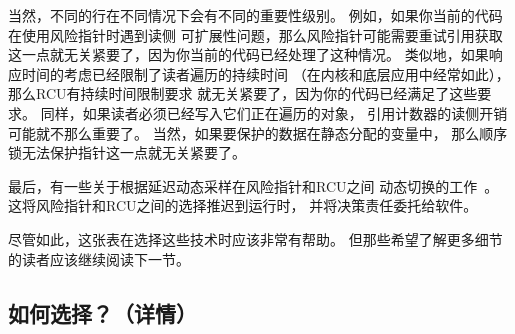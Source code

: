 当然，不同的行在不同情况下会有不同的重要性级别。
例如，如果你当前的代码在使用风险指针时遇到读侧
可扩展性问题，那么风险指针可能需要重试引用获取
这一点就无关紧要了，因为你当前的代码已经处理了这种情况。
类似地，如果响应时间的考虑已经限制了读者遍历的持续时间
（在内核和底层应用中经常如此），那么RCU有持续时间限制要求
就无关紧要了，因为你的代码已经满足了这些要求。
同样，如果读者必须已经写入它们正在遍历的对象，
引用计数器的读侧开销可能就不那么重要了。
当然，如果要保护的数据在静态分配的变量中，
那么顺序锁无法保护指针这一点就无关紧要了。

最后，有一些关于根据延迟动态采样在风险指针和RCU之间
动态切换的工作~\cite{Balmau:2016:FRM:2935764.2935790}。
这将风险指针和RCU之间的选择推迟到运行时，
并将决策责任委托给软件。

尽管如此，这张表在选择这些技术时应该非常有帮助。
但那些希望了解更多细节的读者应该继续阅读下一节。

\subsection{如何选择？（详情）}
\label{sec:defer:Which to Choose? (Details)}

